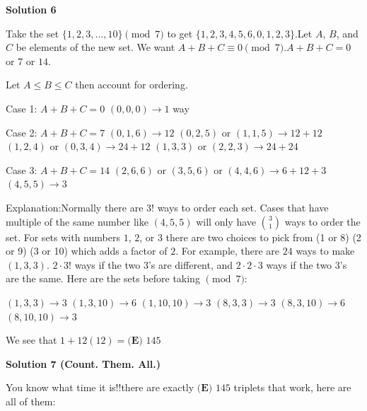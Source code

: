 \begin{enumerate}
\textbf{Solution 6}

Take the set $\{1, 2, 3, ... , 10\} \pmod{7}$ to get $\{1, 2, 3, 4, 5, 6, 0, 1, 2, 3\}$.Let $A$, $B$, and $C$ be elements of the new set. We want $A+B+C \equiv 0 \pmod{7}$.$A+B+C = 0$ or $7$ or $14$.

 Let $A \leq B \leq C$ then account for ordering.

 Case 1: $A+B+C = 0$
$(0, 0, 0) \rightarrow 1$ way

 Case 2: $A+B+C = 7$
$(0, 1, 6) \rightarrow 12$
$(0, 2, 5)$ or $(1, 1, 5) \rightarrow 12 + 12$
$(1, 2, 4)$ or $(0, 3, 4) \rightarrow 24 + 12$
$(1, 3, 3)$ or $(2, 2, 3) \rightarrow 24 + 24$

 Case 3: $A+B+C = 14$
$(2, 6, 6)$ or $(3, 5, 6)$ or $(4, 4, 6) \rightarrow 6 + 12 + 3$
$(4, 5, 5) \rightarrow 3$

 Explanation:Normally there are $3!$ ways to order each set. Cases that have multiple of the same number like $(4, 5, 5)$ will only have $\binom{3}{1}$ ways to order the set. For sets with numbers $1$, $2$, or $3$ there are two choices to pick from (1 or 8) (2 or 9) (3 or 10) which adds a factor of $2$. For example, there are $24$ ways to make $(1, 3, 3)$. $2 \cdot 3!$ ways if the two 3’s are different, and $2 \cdot 2 \cdot 3$ ways if the two 3’s are the same. Here are the sets before taking $\pmod{7}$:

 $(1, 3, 3) \rightarrow 3$
$(1, 3, 10) \rightarrow 6$
$(1, 10, 10) \rightarrow 3$
$(8, 3, 3) \rightarrow 3$
$(8, 3, 10) \rightarrow 6$
$(8, 10, 10) \rightarrow 3$

 We see that $1 + 12(12) = \boxed{\textbf{(E) }145}$




\textbf{Solution 7 (Count. Them. All.)}

You know what time it is!!there are exactly $\boxed{\textbf{(E) }145}$ triplets that work, here are all of them:


\end{enumerate}
